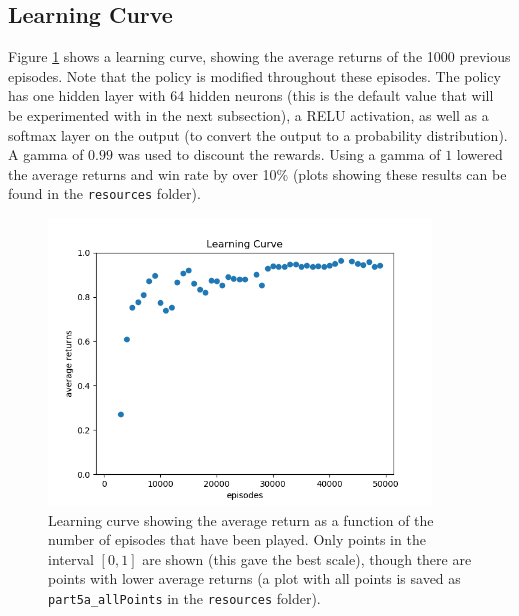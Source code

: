 \documentclass{article}
\begin{document}
   \subsection{Learning Curve}
   Figure \ref{fig:5a} shows a learning curve, showing the average returns of the 1000 previous episodes. Note
   that the policy is modified throughout these episodes. The policy has one hidden layer with 64 hidden neurons
   (this is the default value that will be experimented with in the next subsection), a RELU activation, as well
   as a softmax layer on the output (to convert the output to a probability distribution). A gamma of $0.99$ was used
   to discount the rewards. Using a gamma of $1$ lowered the average returns and win rate by over 10\% (plots showing
   these results can be found in the \texttt{resources} folder).
      \begin{figure}[h] \centering
          \includegraphics[width=4in]{resources/part5a_scaled}
          \caption{ Learning curve showing the average return as a function of the number of episodes
                  that have been played. Only points in the interval $[0,1]$ are shown (this gave the best scale),
                  though there are points with lower average returns (a plot with all points is saved
                  as \texttt{part5a\_allPoints} in the \texttt{resources} folder). }
          \label{fig:5a}
       \end{figure}
\end{document}
